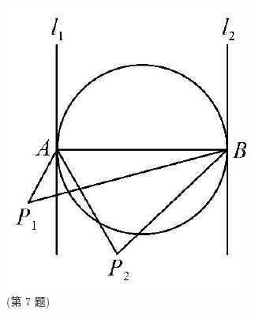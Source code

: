\documentclass[10pt]{article}
\begin{document}
\includegraphics[max width=\textwidth, center]{2024_10_30_66b8e5e701da2093c133g-108}\\
(第 7 题)
\end{document}
